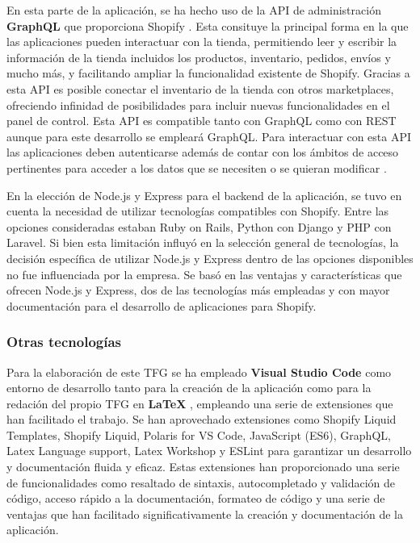\documentclass[12pt]{article}
\begin{document}
En esta parte de la aplicación, se ha hecho uso de la API de administración \textbf{GraphQL} que proporciona Shopify \cite{api-administracion-graphql}. Esta consituye la principal forma en la que 
las aplicaciones pueden interactuar con la tienda, permitiendo leer y escribir la información de la tienda incluidos los productos, inventario, pedidos,
envíos y mucho más, y facilitando ampliar la funcionalidad existente de Shopify. Gracias a esta API es posible conectar el inventario
de la tienda con otros marketplaces, ofreciendo infinidad de posibilidades para incluir nuevas funcionalidades en el panel de control.
Esta API es compatible tanto con GraphQL como con REST aunque para este desarrollo se empleará GraphQL. Para interactuar con esta API las aplicaciones
deben autenticarse además de contar con los ámbitos de acceso pertinentes para acceder a los datos que se necesiten o se quieran modificar \cite{shopify-dev}.

En la elección de Node.js y Express para el backend de la aplicación, se tuvo en cuenta la necesidad de utilizar tecnologías compatibles con Shopify. Entre 
las opciones consideradas estaban Ruby on Rails, Python con Django y PHP con Laravel. Si bien esta limitación influyó en la selección general de tecnologías, 
la decisión específica de utilizar Node.js y Express dentro de las opciones disponibles no fue influenciada por la empresa. Se basó en las ventajas 
y características que ofrecen Node.js y Express, dos de las tecnologías más empleadas y con mayor documentación para el desarrollo de aplicaciones para Shopify.

\subsubsection{Otras tecnologías}
Para la elaboración de este TFG se ha empleado \textbf{Visual Studio Code} \cite{vsc} como entorno de desarrollo tanto para la creación de la aplicación como para
la redación del propio TFG en \textbf{LaTeX} \cite{latex}, empleando una serie de extensiones que han facilitado el trabajo. 
Se han aprovechado extensiones como Shopify Liquid Templates, Shopify Liquid, 
Polaris for VS Code, JavaScript (ES6), GraphQL, Latex Language support, Latex Workshop y ESLint para garantizar un desarrollo y documentación
fluida y eficaz. Estas extensiones han proporcionado una serie de funcionalidades como resaltado de sintaxis, autocompletado y validación de código, 
acceso rápido a la documentación, formateo de código y una serie de ventajas que han facilitado significativamente la creación y documentación de la aplicación.
\end{document}
